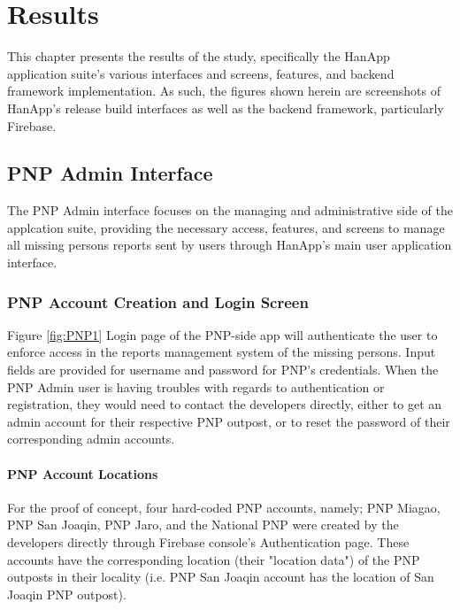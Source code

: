 \chapter{Results}
This chapter presents the results of the study, specifically the HanApp application suite's various interfaces and screens, features, and backend framework implementation. As such, the figures shown herein are screenshots of HanApp's release build interfaces as well as the backend framework, particularly Firebase.

\section{PNP Admin Interface}
The PNP Admin interface focuses on the managing and administrative side of the applcation suite, providing the necessary access, features, and screens to manage all missing persons reports sent by users through HanApp's main user application interface.

\subsection{PNP Account Creation and Login Screen}

Figure \ref{fig:PNP1} Login page of the PNP-side app will authenticate the user to enforce access in the reports management system of the missing persons. Input fields are provided for username and password for PNP’s credentials. When the PNP Admin user is having troubles with regards to authentication or registration, they would need to contact the developers directly, either to get an admin account for their respective PNP outpost, or to reset the password of their corresponding admin accounts. 

\subsubsection{PNP Account Locations}

For the proof of concept, four hard-coded PNP accounts, namely; PNP Miagao, PNP San Joaqin, PNP Jaro, and the National PNP were created by the developers directly through Firebase console's Authentication page. These accounts have the corresponding location (their "location data") of the PNP outposts in their locality (i.e. PNP San Joaqin account has the location of San Joaqin PNP outpost). 

